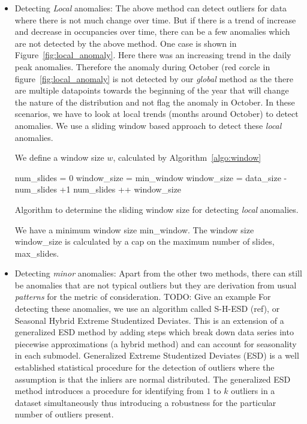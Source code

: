 \documentclass[10pt]{sigplanconf}
\begin{document}
\begin{enumerate}
\begin{itemize}
\item Detecting \textit{Local} anomalies:  The above method can detect outliers for data where there is not much change over time.  But if there is a trend of increase and decrease in occupancies over time, there can be a few anomalies which are not detected by the above method.  One case is shown in Figure~\ref{fig:local_anomaly}.  Here there was an increasing trend in the daily peak anomalies.  Therefore the anomaly during October (red corcle in figure~\ref{fig:local_anomaly} is not detected by our \textit{global} method as the there are multiple datapoints towards the beginning of the year that will change the nature of the distribution and not flag the anomaly in October.  In these scenarios, we have to look at local trends (months around October) to detect anomalies.  We use a sliding window based approach to detect these \textit{local} anomalies.

We define a window size $w$, calculated by Algorithm~\ref{algo:window}

\begin{algorithm}[h]
num\_slides = 0 \;
window\_size = min\_window \;  
  {
 window\_size = data\_size - num\_slides +1 \;
 num\_slides ++ \;
 }
 \Return window\_size  \;
  
\caption{Algorithm to determine the sliding window size for detecting \textit{local} anomalies.}\label{algo:window}
\end{algorithm}

We have a minimum window size min\_window.  The window size window\_size is calculated by a cap on the maximum number of slides, max\_slides.

\item Detecting \textit{minor} anomalies:  Apart from the other two methods, there can still be anomalies that are not typical outliers but they are derivation from usual \textit{patterns} for the metric of consideration.  TODO: Give an example For detecting these anomalies, we use an algorithm called S-H-ESD (ref), or Seasonal Hybrid Extreme Studentized Deviates. This is an extension of a generalized ESD method by adding steps which break down data series into piecewise approximations (a hybrid method) and can account for seasonality in each submodel. Generalized Extreme Studentized Deviates (ESD) is a well established statistical procedure for the detection of outliers where the assumption is that the inliers are normal distributed. The generalized ESD method introduces a procedure for identifying from $1$ to $k$ outliers in a dataset simultaneously thus introducing a robustness for the particular number of outliers present.


\end{itemize}
\end{enumerate}
\end{document}
